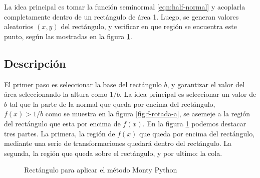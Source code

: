 % 
La idea principal es tomar la función seminormal \eqref{eqn:half-normal} y acoplarla completamente dentro de un rectángulo de área 1.
Luego, se generan valores aleatorios $(x,y)$ del rectángulo, y verificar en que región se encuentra este punto, según las mostradas en la figura \ref{fig:rectangle}.
% 
\subsection{Descripción}
El primer paso es seleccionar la base del rectángulo $b$, y garantizar el valor del área seleccionando la altura como $1/b$.
La idea principal es seleccionar un valor de $b$ tal que la parte de la normal que queda por encima del rectángulo, $f(x)>1/b$ como se muestra en la figura \ref{fig:f-rotada-a}, se asemeje
a la región del rectángulo que esta por encima de $f(x)$.
En la figura \ref{fig:rectangle} podemos destacar tres partes.
La primera, la región de $f(x)$ que queda por encima del rectángulo, mediante una serie de transformaciones quedará dentro del rectángulo.
La segunda, la región que queda sobre el rectángulo, y por ultimo: la cola.
\begin{figure}[ht!]
    \centering
    \caption{Rectángulo para aplicar el método Monty Python}
    \label{fig:rectangle}
\end{figure}
